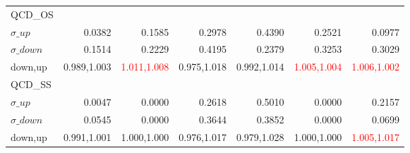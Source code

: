 \documentclass[11pt,oneside,a4paper]{article}
\begin{document}
\begin{table}
\begin{tabular}{lrrrrrr}
\hline
QCD\_OS &  &  &  &  &  &  \\
$\sigma\_up$ & 0.0382 & 0.1585 & 0.2978 & 0.4390 & 0.2521 & 0.0977 \\
$\sigma\_down$ & 0.1514 & 0.2229 & 0.4195 & 0.2379 & 0.3253 & 0.3029 \\
down,up & 0.989,1.003 & \textcolor{red}{1.011,1.008} & 0.975,1.018 & 0.992,1.014 & \textcolor{red}{1.005,1.004} & \textcolor{red}{1.006,1.002} \\

\hline
QCD\_SS &  &  &  &  &  &  \\
$\sigma\_up$ & 0.0047 & 0.0000 & 0.2618 & 0.5010 & 0.0000 & 0.2157 \\
$\sigma\_down$ & 0.0545 & 0.0000 & 0.3644 & 0.3852 & 0.0000 & 0.0699 \\
down,up & 0.991,1.001 & 1.000,1.000 & 0.976,1.017 & 0.979,1.028 & 1.000,1.000 & \textcolor{red}{1.005,1.017} \\

\hline
\end{tabular}
\end{table}
\end{document}

